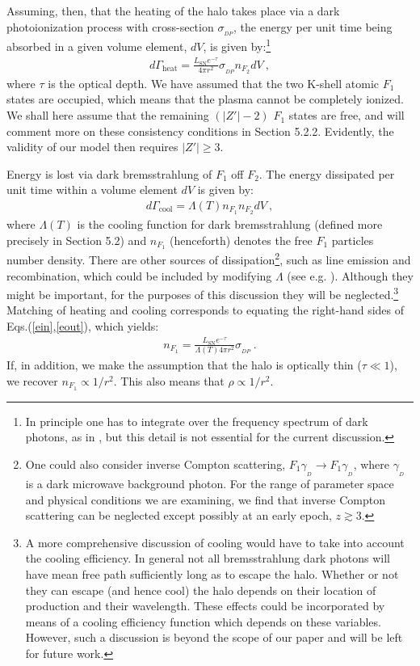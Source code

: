 \documentclass[12pt]{article}
\begin{document}
{{Assuming, then, that the heating of the halo takes place via a dark photoionization process with cross-section $\sigma _{_{DP}}$, the energy per unit time being absorbed in a given volume element, $dV$, is given by:\footnote{In principle one has to integrate over the frequency spectrum of dark photons, as in \cite{depth4}, but this detail is not essential for the current discussion.}
%
\begin{eqnarray}
d\Gamma _{\text{heat}} = \frac{L _{\text{SN}}e ^{-\tau}}{4\pi r ^2}\sigma _{_{DP}}n _{F_2} dV \ ,
\label{ein}
\end{eqnarray}
%
where $\tau$ is the optical depth. We have assumed that the two K-shell atomic $F_1$ states are occupied, which means that the plasma cannot be completely ionized. We shall here assume that the remaining $(|Z'|-2)$ $F_1$ states are free, and will comment more on these consistency conditions in Section 5.2.2. Evidently, the validity of our model then requires $|Z'| \geq 3$.

Energy is lost via dark bremsstrahlung of $F _1$ off $F _2$. The energy dissipated per unit time within a volume element $dV$ is given by:
%
\begin{eqnarray}
d\Gamma _{\text{cool}} = \Lambda (T) n _{F_1}n _{F_2} dV \ ,
\label{eout}
\end{eqnarray}
%
where $\Lambda(T)$ is the cooling function for dark bremsstrahlung (defined more precisely in Section 5.2) and $n _{F_1}$ (henceforth) denotes the free $F_1$ particles number density. There are other sources of dissipation\footnote{One could also consider inverse Compton scattering, $F_1 \gamma _{_D} \rightarrow F_1 \gamma _{_D}$, where $\gamma _{_D}$ is a dark microwave background photon. For the range of parameter space and physical conditions we are examining, we find that inverse Compton scattering can be neglected except possibly at an early epoch, $z \gtrsim 3$.}, such as line emission and recombination, which could be included by modifying $\Lambda$ (see e.g. \cite{radiative}). Although they might be important, for the purposes of this discussion they will be neglected.\footnote{A more comprehensive discussion of cooling would have to take into account the cooling efficiency. In general not all bremsstrahlung dark photons will have mean free path sufficiently long as to escape the halo. Whether or not they can escape (and hence cool) the halo depends on their location of production and their wavelength. These effects could be incorporated by means of a cooling efficiency function which depends on these variables. However, such a discussion is beyond the scope of our paper and will be left for future work.} Matching of heating and cooling corresponds to equating the right-hand sides of Eqs.(\ref{ein},\ref{eout}), which yields:
%
\begin{eqnarray}
n _{F_1} = \frac{L _{\text{SN}}e ^{-\tau}}{\Lambda (T)4\pi r ^2}\sigma _{_{DP}} \ .
\label{match}
\end{eqnarray}
%
If, in addition, we make the assumption that the halo is optically thin ($\tau \ll 1$), we recover $n _{F_1} \propto 1/r ^2$. This also means that $\rho \propto 1/r ^2$.

}}
\end{document}
